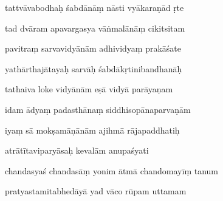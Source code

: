\documentclass[article,12pt,a4paper]{memoir}%
\newcounter{parCount}
\begin{document}
	  
	  \pstart \leavevmode%
	tattvāvabodhaḥ śabdānāṃ nāsti vyākaraṇād ṛte 
	{}
	\pend%
      

	  
	  \pstart {} tad dvāram apavargasya vāṅmalānāṃ cikitsitam 
	{}
	\pend%
      

	  
	  \pstart \leavevmode%
	pavitraṃ sarvavidyānām adhividyaṃ prakāśate 
	{}
	\pend%
      

	  
	  \pstart {} yathārthajātayaḥ sarvāḥ śabdākṛtinibandhanāḥ 
	{}
	\pend%
      

	  
	  \pstart \leavevmode%
	tathaiva loke vidyānām eṣā vidyā parāyaṇam 
	{}
	\pend%
      

	  
	  \pstart {} idam ādyaṃ padasthānaṃ siddhisopānaparvaṇām 
	{}
	\pend%
      

	  
	  \pstart \leavevmode%
	iyaṃ sā mokṣamāṇānām ajihmā rājapaddhatiḥ 
	{}
	\pend%
      

	  
	  \pstart {} atrātītaviparyāsaḥ kevalām anupaśyati 
	{}
	\pend%
      

	  
	  \pstart \leavevmode%
	chandasyaś chandasāṃ yonim ātmā chandomayīṃ tanum 
	{}
	\pend%
      

	  
	  \pstart {} pratyastamitabhedāyā yad vāco rūpam uttamam 
	{}
	\pend%
      
\end{document}
